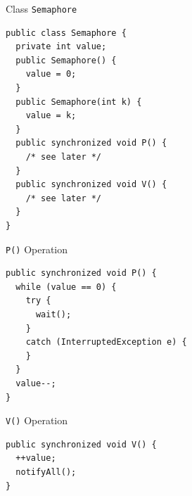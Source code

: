 \begin{frame}[fragile]{Class \lstinline!Semaphore!}
\begin{lstlisting}
public class Semaphore {
  private int value;
  public Semaphore() { 
    value = 0; 
  }
  public Semaphore(int k) { 
    value = k; 
  }
  public synchronized void P() { 
    /* see later */ 
  }
  public synchronized void V() { 
    /* see later */ 
  }   
}
\end{lstlisting}
\end{frame}

\begin{frame}[fragile]{\lstinline!P()! Operation}
\begin{lstlisting}
public synchronized void P() {
  while (value == 0) {
    try {
      wait();
    }
    catch (InterruptedException e) { 
    }
  }
  value--;
}
\end{lstlisting}
\end{frame}

\begin{frame}[fragile]{\lstinline!V()! Operation}
\begin{lstlisting}
public synchronized void V() {
  ++value;
  notifyAll();
}
\end{lstlisting}
\end{frame}

